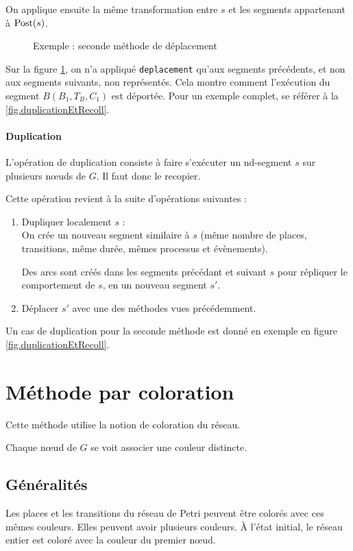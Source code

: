 On applique ensuite la même transformation entre $s$ et les segments appartenant à $\operatorname{Post}(s)$.

\begin{figure}[H]
\centering

\caption{Exemple : seconde méthode de déplacement}
\label{fig:deplacementForm2}
\end{figure}

Sur la figure \ref{fig:deplacementForm2}, on n'a appliqué \texttt{deplacement} qu'aux segments précédents, et non aux segments suivants, non représentés.
Cela montre comment l'exécution du segment $B(B_1, T_B, C_1)$ est déportée.
Pour un exemple complet, se référer à la \cref{fig.duplicationEtRecoll}.

\paragraph{Duplication}
L'opération de duplication consiste à faire s'exécuter un nd-segment $s$ sur plusieurs nœuds de $G$. Il faut donc le recopier.

Cette opération revient à la suite d'opérations suivantes : 
\begin{enumerate}
\item Dupliquer localement $s$ : \\
		On crée un nouveau segment similaire à $s$ (même nombre de places, transitions, même durée, mêmes processus et évènements).
		
		Des arcs sont créés dans les segments précédant et suivant $s$ pour répliquer le comportement de $s$, en un nouveau segment $s'$.
\item Déplacer $s'$ avec une des méthodes vues précédemment.
\end{enumerate}

Un cas de duplication pour la seconde méthode est donné en exemple en figure \ref{fig.duplicationEtRecoll}.

\section{Méthode par coloration}
Cette méthode utilise la notion de coloration du réseau.

Chaque nœud de $G$ se voit associer une couleur distincte.

\subsection{Généralités}
Les places et les transitions du réseau de Petri peuvent être colorés avec ces mêmes couleurs. Elles peuvent avoir plusieurs couleurs.
À l'état initial, le réseau entier est coloré avec la couleur du premier nœud.


